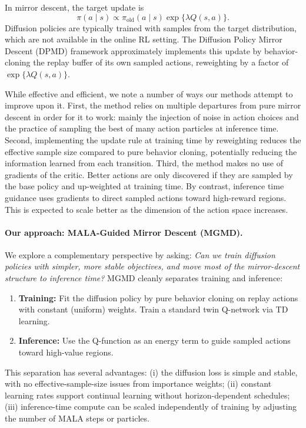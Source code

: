\documentclass{article}
\theoremstyle{plain}
\theoremstyle{definition}
\theoremstyle{remark}
\begin{document}
In mirror descent, the target update is 
\begin{equation}
  \pi(a\mid s) \propto \pi_\mathrm{old}(a\mid s) \exp\{\lambda Q(s,a)\}.
  \label{eq:md-tilt}
\end{equation}
Diffusion policies are typically trained with samples from the target distribution, which are not available in the online RL setting.
The Diffusion Policy Mirror Descent (DPMD) framework \citep{ma2025soft} approximately implements this update by behavior-cloning the replay buffer of its own sampled actions, reweighting by a factor of $\exp\{\lambda Q(s,a)\}$.

While effective and efficient, we note a number of ways our methods attempt to improve upon it.
First, the method relies on multiple departures from pure mirror descent in order for it to work: mainly the injection of noise in action choices and the practice of sampling the best of many action particles at inference time.
Second, implementing the update rule at training time by reweighting reduces the effective sample size compared to pure behavior cloning, potentially reducing the information learned from each transition. 
Third, the method makes no use of gradients of the critic. Better actions are only discovered if they are sampled by the base policy and up-weighted at training time. By contrast, inference time guidance uses gradients to direct sampled actions toward high-reward regions. This is expected to scale better as the dimension of the action space increases.

\paragraph{Our approach: MALA-Guided Mirror Descent (MGMD).}
We explore a complementary perspective by asking: \emph{Can we train diffusion policies with simpler, more stable objectives, and move most of the mirror-descent structure to inference time?}
MGMD cleanly separates training and inference:
\begin{enumerate}
  \item \textbf{Training:} Fit the diffusion policy by pure behavior cloning on replay actions with constant (uniform) weights. Train a standard twin Q-network via TD learning.
  \item \textbf{Inference:} Use the Q-function as an energy term to guide sampled actions toward high-value regions.
\end{enumerate}
This separation has several advantages: (i) the diffusion loss is simple and stable, with no effective-sample-size issues from importance weights; (ii) constant learning rates support continual learning without horizon-dependent schedules; (iii) inference-time compute can be scaled independently of training by adjusting the number of MALA steps or particles.
\end{document}
